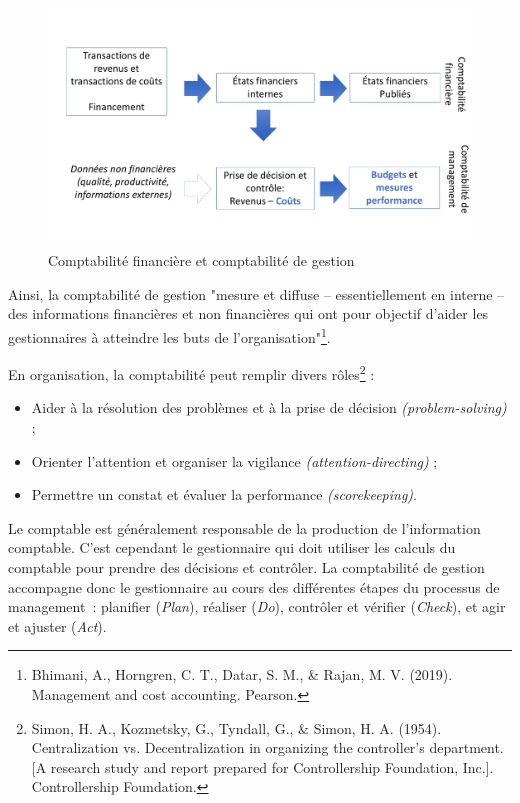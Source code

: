 \documentclass[oneside]{kaobook}
\begin{document}
\begin{figure}[H]

\includegraphics{./img/comptafi.pdf}
\caption{\label{fig:orgccf4c6a}Comptabilité financière et comptabilité de gestion}
\end{figure}

Ainsi, la comptabilité de gestion "mesure et diffuse – essentiellement en interne – des informations financières et non financières qui ont pour objectif d'aider les gestionnaires à atteindre les buts de l’organisation"\footnote{Bhimani, A., Horngren, C. T., Datar, S. M., \& Rajan, M. V. (2019). Management and cost accounting. Pearson.}.

En organisation, la comptabilité peut remplir divers rôles\footnote{Simon, H. A., Kozmetsky, G., Tyndall, G., \& Simon, H. A. (1954). Centralization vs. Decentralization in organizing the controller’s department. [A research study and report prepared for Controllership Foundation, Inc.]. Controllership Foundation.} :
\begin{itemize}
\item Aider à la résolution des problèmes et à la prise de décision \emph{(problem-solving)} ;
\item Orienter l’attention et organiser la vigilance \emph{(attention-directing)} ;
\item Permettre un constat et évaluer la performance \emph{(scorekeeping)}.
\end{itemize}

Le comptable est généralement responsable de la production de l'information comptable. C'est cependant le gestionnaire qui doit utiliser les calculs du comptable pour prendre des décisions et contrôler. La comptabilité de gestion accompagne donc le gestionnaire au cours des différentes étapes du processus de management : planifier (\emph{Plan}), réaliser (\emph{Do}), contrôler et vérifier (\emph{Check}), et agir et ajuster (\emph{Act}).
\end{document}
